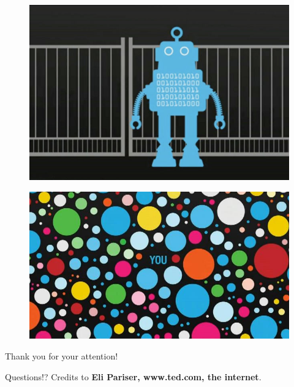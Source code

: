 \documentclass[14pt]{beamer}
\begin{document}
\begin{frame}
    \begin{figure}[h!]
    \centering
    \includegraphics[scale=0.4]{./img/filter-bubbles2.jpg}
\end{figure}
\end{frame}

\begin{frame}
\begin{figure}[h!]
    \centering
    \includegraphics[scale=0.6]{./img/filter-bubbles3.jpg}
\end{figure}
\end{frame}

\begin{frame}
\begin{center}
    {\Large Thank you for your attention!}

    \vfill
    {\huge Questions!?}
    \vfill
    \small Credits to \textbf{Eli Pariser, www.ted.com, the internet}.
\end{center}
\end{frame}
\end{document}
